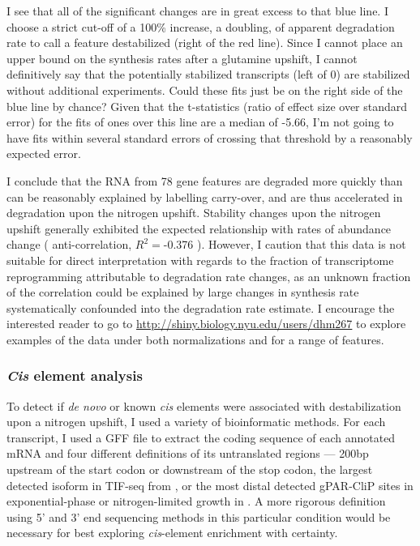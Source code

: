 I see that all of the significant changes are in great excess to that
blue line. I choose a strict cut-off of a 100\%
increase, a doubling, of apparent degradation rate to call a feature
destabilized (right of the red line). Since I cannot place an upper
bound on the synthesis rates after a glutamine upshift, I cannot
definitively say that the potentially stabilized transcripts (left of 0)
are stabilized without additional experiments.
Could these fits just be on the right side of the blue line by chance?
Given that the t-statistics (ratio of effect size over standard error)
for the fits of ones over this line are a median of -5.66,
I'm not going to have fits within several standard errors of
crossing that threshold by a reasonably expected error.

I conclude that the RNA from 78 gene features are degraded 
more quickly than can be reasonably
explained by labelling carry-over, and are thus accelerated in
degradation upon the nitrogen upshift.
Stability changes upon the nitrogen upshift generally exhibited the  
expected relationship with rates of abundance change (               
anti-correlation, $R^2=$-0.376 ).
However, I caution that this data is not suitable for direct
interpretation with regards to the fraction of transcriptome
reprogramming attributable to degradation rate changes, 
as an unknown fraction of the correlation could be explained
by large changes in synthesis rate systematically confounded into
the degradation rate estimate.
I encourage the interested reader to go to
\url{http://shiny.biology.nyu.edu/users/dhm267} to explore examples of
the data under both normalizations and for a range of features.

\subsubsection{\textit{Cis} element analysis}

To detect if \textit{de novo} or known \textit{cis} elements were 
associated with destabilization upon a nitrogen upshift,
I used a variety of bioinformatic methods.  
For each transcript, I used a GFF file to extract the coding sequence
of each annotated mRNA and four different definitions of its
untranslated regions --- 
200bp upstream of the start codon or downstream
of the stop codon, the largest detected isoform in TIF-seq from
\parencite{pelechano2014genome}, 
or the most distal detected gPAR-CliP sites in
exponential-phase or nitrogen-limited growth in 
\parencite{freeberg2013pervasive}.
A more rigorous definition using 5' and 3' end sequencing methods 
in this particular condition would be necessary for best exploring 
\textit{cis}-element enrichment with certainty. 

